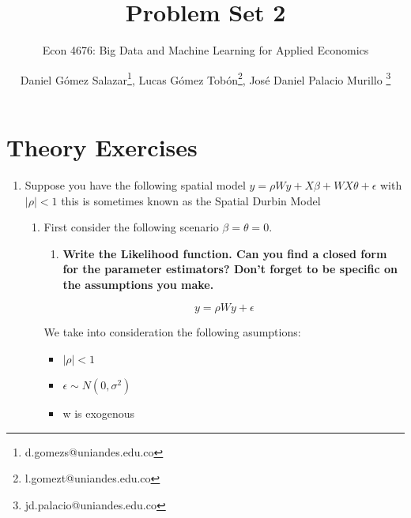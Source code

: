 \documentclass[12pt,onecolumn]{article}
\title{Problem Set 2}
\subtitle{Econ 4676: Big Data and Machine Learning for Applied Economics}
\author{Daniel Gómez Salazar\thanks{d.gomezs@uniandes.edu.co}, Lucas Gómez Tobón\thanks{l.gomezt@uniandes.edu.co}, José Daniel Palacio Murillo \thanks{jd.palacio@uniandes.edu.co}}
\date{}
\begin{document}
\maketitle

\section{Theory Exercises}

\begin{enumerate}
    \item Suppose you have the following spatial model $y=\rho W y + X\beta + WX\theta  +\epsilon$ with $|\rho|<1$  this is sometimes known as the Spatial Durbin Model
    \begin{enumerate}
      \item First consider the following scenario  $\beta=\theta=0$. 
        \begin{enumerate}
            \item \bf{Write the Likelihood function. Can you find a closed form for the parameter estimators? Don't forget to be specific on the assumptions you make.}
        \end{enumerate}

        \begin{equation*}
            y=\rho{Wy}+\epsilon
        \end{equation*}

        We take into consideration the following asumptions:

        \begin{itemize}
            \item $\lvert \rho \rvert < 1$
            \item $\epsilon \sim N(0,\sigma^2)$
            \item w is exogenous
        \end{itemize}


\end{enumerate}
\end{enumerate}
\end{document}
